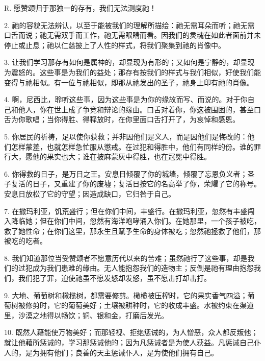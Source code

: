 R. 愿赞颂归于那独一的存有，我们无法测度祂！\par

2. 祂的容貌无法辨认，以至于能被我们的理解所描绘：祂无需耳朵而听；祂无需口舌而说；祂无需双手而工作，祂无需眼睛而看。因我们的灵魂在如此者面前并未停止或止息；祂以仁慈披上了人性的样式，将我们聚集到祂的肖像中。\par

3. 让我们学习那存有如何是属神的，却显现为有形的；又如何是宁静的，却显现为震怒的。这些事是为我们的益处；那存有按我们的样式与我们相似，好使我们能变得与祂相似。有一位与祂相似，即那从祂发出的圣子，祂身上印有祂的肖像。\par

4. 啊，尼西比，聆听这些事，因为这些事是为你的缘故而写、而说的。对于你自己和他人，你在世上成了争竞和辩论的缘由。口舌对着你，你这被围困的，甚至口舌为你歌唱；当你得胜、得释放时，在你里面口舌打开了，为哀悼和感恩。\par

5. 你居民的祈祷，足以使你获救；并非因他们是义人，而是因他们是悔改的：他们怎样蒙羞，也就怎样急忙服从懲戒。在过犯和得胜中，他们有同样的份。谁的罪行大，愿他的果实也大；谁在披麻蒙灰中得胜，也在冠冕中得胜。\par

6. 你得救的日子，是万日之王。安息日倾覆了你的城墙，倾覆了忘恩负义者；圣子复活的日子，又重建了你的废墟；复活日按它的名高举了你，荣耀了它的称号。安息日放松了它的守望；因造成缺口，它归咎于自己。\par

7. 在撒玛利亚，饥荒盛行；但在你们中间，丰盛行。在撒玛利亚，忽然有丰盛闯入降临她；但在你们中间，忽然有海洋咆哮涌入你们。在她那里，一个孩子被吃，救了她性命；在你们这里，那永生且赋予生命的身体被吃；忽然祂拯救了他们，那被吃的吃者。\par

8. 我们知道那位当受赞颂者不愿意历代以来的苦难；虽然祂行了这些事，却是我们的过犯成为我们患难的缘由。无人能抱怨我们的造物主；反倒是祂有理由抱怨我们，我们犯了罪，迫使祂虽不愿发怒却发怒，虽不愿击打却击打。\par

9. 大地、葡萄树和橄榄树，都需要修剪。橄榄被压榨时，它的果实香气四溢；葡萄树被修剪时，它的葡萄美好；土壤被耕种时，它的收成丰盛。水被约束在渠道里，沙漠之地得以畅饮；铜、银和金，打磨后发光。\par

10. 既然人藉能使万物美好；而那轻视、拒绝惩诫的，为人憎恶，众人都反叛他；就让他藉所惩诫的，学习那惩诫他的；因为凡惩诫者是为使人获益。凡惩诫自己仆人的，是为拥有他们；良善的天主惩诫仆人，是为使他们拥有自己。\par

